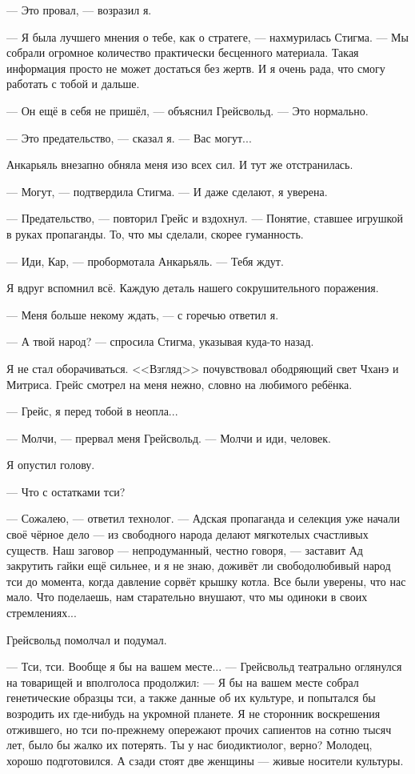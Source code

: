 --- Это провал, --- возразил я.

--- Я была лучшего мнения о тебе, как о стратеге, --- нахмурилась Стигма.
--- Мы собрали огромное количество практически бесценного материала.
Такая информация просто не может достаться без жертв.
И я очень рада, что смогу работать с тобой и дальше.

--- Он ещё в себя не пришёл, --- объяснил Грейсвольд.
--- Это нормально.

--- Это предательство, --- сказал я.
--- Вас могут...

Анкарьяль внезапно обняла меня изо всех сил.
И тут же отстранилась.

--- Могут, --- подтвердила Стигма.
--- И даже сделают, я уверена.

--- Предательство, --- повторил Грейс и вздохнул.
--- Понятие, ставшее игрушкой в руках пропаганды.
То, что мы сделали, скорее гуманность.

--- Иди, Кар, --- пробормотала Анкарьяль.
--- Тебя ждут.

Я вдруг вспомнил всё.
Каждую деталь нашего сокрушительного поражения.

--- Меня больше некому ждать, --- с горечью ответил я.

--- А твой народ? --- спросила Стигма, указывая куда-то назад.

Я не стал оборачиваться.
<<Взгляд>> почувствовал ободряющий свет Чханэ и Митриса.
Грейс смотрел на меня нежно, словно на любимого ребёнка.

--- Грейс, я перед тобой в неопла...

--- Молчи, --- прервал меня Грейсвольд.
--- Молчи и иди, человек.

Я опустил голову.

--- Что с остатками тси?

--- Сожалею, --- ответил технолог.
--- Адская пропаганда и селекция уже начали своё чёрное дело --- из свободного народа делают мягкотелых счастливых существ.
Наш заговор --- непродуманный, честно говоря, --- заставит Ад закрутить гайки ещё сильнее, и я не знаю, доживёт ли свободолюбивый народ тси до момента, когда давление сорвёт крышку котла.
Все были уверены, что нас мало.
Что поделаешь, нам старательно внушают, что мы одиноки в своих стремлениях...

Грейсвольд помолчал и подумал.

--- Тси, тси.
Вообще я бы на вашем месте... --- Грейсвольд театрально оглянулся на товарищей и вполголоса продолжил:
--- Я бы на вашем месте собрал генетические образцы тси, а также данные об их культуре, и попытался бы возродить их где-нибудь на укромной планете.
Я не сторонник воскрешения отжившего, но тси по-прежнему опережают прочих сапиентов на сотню тысяч лет, было бы жалко их потерять.
Ты у нас биодиктиолог, верно?
Молодец, хорошо подготовился.
А сзади стоят две женщины --- живые носители культуры.


